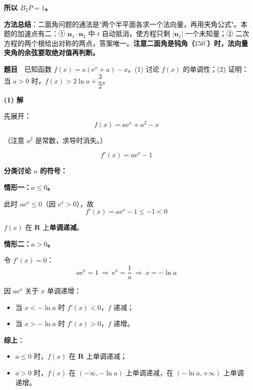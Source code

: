 \textbf{所以 $B_2P=1$。}

\begin{gktip}
\textbf{方法总结}：二面角问题的通法是"两个半平面各求一个法向量，再用夹角公式"。本题的加速点有二：① $\boldsymbol n_1\cdot\boldsymbol n_2$ 中 $t$ 自动抵消，使方程只剩 $\left|\boldsymbol n_1\right|$ 一个未知量；② 二次方程的两个根给出对称的两点，答案唯一。\textbf{注意二面角是钝角（$150^\circ$）时，法向量夹角的余弦要取绝对值再判断。}
\end{gktip}

\par\medskip


\textbf{题目}　已知函数 $f(x)=a\left(\mathrm e^{x}+a\right)-x$。(1) 讨论 $f(x)$ 的单调性；(2) 证明：当 $a>0$ 时，$f(x)>2\ln a+\dfrac32$。

\par\medskip

\textbf{(1) 解}

先展开：
\[f(x)=a\mathrm e^{x}+a^{2}-x\]

（注意 $a^{2}$ 是常数，求导时消失。）

\[f'(x)=a\mathrm e^{x}-1\]

\textbf{分类讨论 $a$ 的符号：}

\textbf{情形一：$a\le0$。}

此时 $a\mathrm e^{x}\le0$（因 $\mathrm e^{x}>0$），故
\[f'(x)=a\mathrm e^{x}-1\le-1<0\]

$f(x)$ 在 $\mathbf R$ 上\textbf{单调递减}。

\textbf{情形二：$a>0$。}

令 $f'(x)=0$：
\[a\mathrm e^{x}=1\ \Longrightarrow\ \mathrm e^{x}=\frac1a\ \Longrightarrow\ x=-\ln a\]

因 $a\mathrm e^{x}$ 关于 $x$ 单调递增：
\begin{itemize}
\item 当 $x<-\ln a$ 时 $f'(x)<0$，$f$ 递减；
\item 当 $x>-\ln a$ 时 $f'(x)>0$，$f$ 递增。
\end{itemize}

\textbf{综上}：
\begin{itemize}
\item $a\le0$ 时，$f(x)$ 在 $\mathbf R$ 上单调递减；
\item $a>0$ 时，$f(x)$ 在 $(-\infty,-\ln a)$ 上单调递减，在 $(-\ln a,+\infty)$ 上单调递增。
\end{itemize}

\par\medskip

